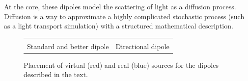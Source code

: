 At the core, these dipoles model the scattering of light as a diffusion process. Diffusion is a way to approximate a highly complicated stochastic process (such as a light transport simulation) with a structured mathematical description. 

\begin{figure}
\centering
\begin{tabular}{@{}c@{\hskip 1em}c@{}}
\def\svgwidth{0.5\textwidth} &  \def\svgwidth{0.5\textwidth} \\
Standard and better dipole &  Directional dipole \\
\end{tabular}
\caption{Placement of virtual (red) and real (blue) sources for the dipoles described in the text.} 
\label{fig:bssrdfsources}
\end{figure}

